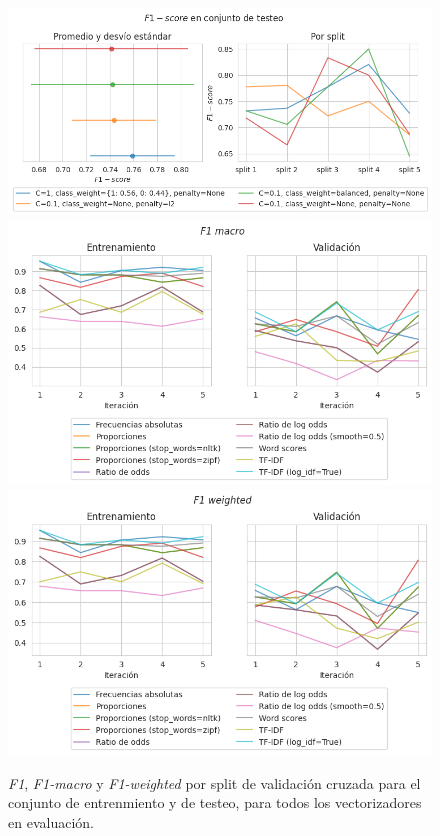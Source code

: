 \begin{figure}[!htb]
    \centering
    \includegraphics[scale=0.45]{./images/graphs/f1_by_split.png}
    \vfill
    \includegraphics[scale=0.45]{./images/graphs/f1_macro_by_split.png}
    \vfill
    \includegraphics[scale=0.45]{./images/graphs/f1_weighted_by_split.png}
    \caption{\textit{F1}, \textit{F1-macro} y \textit{F1-weighted} por split
    de validaci\'on cruzada para el conjunto de entrenmiento y de testeo,
    para todos los vectorizadores en evaluaci\'on.}
    \label{fig-vectorizers-f1}
\end{figure}
\FloatBarrier

